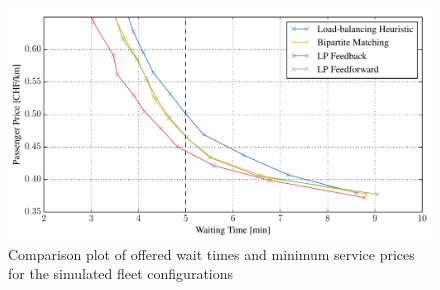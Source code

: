 
\begin{figure}
\includegraphics[width=1.0\textwidth]{figures/time_vs_price.pdf}
\caption{Comparison plot of offered wait times and minimum service prices for the
simulated fleet configurations}
\label{fig:time_vs_price}
\end{figure}
